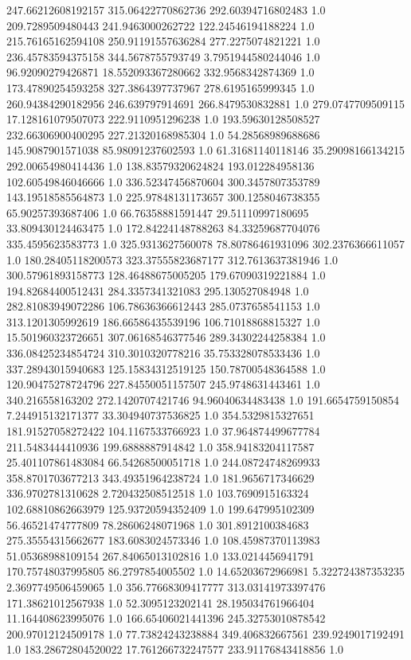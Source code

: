 247.66212608192157	315.06422770862736	292.60394716802483	1.0
209.7289509480443	241.9463000262722	122.24546194188224	1.0
215.76165162594108	250.91191557636284	277.2275074821221	1.0
236.45783594375158	344.5678755793749	3.7951944580244046	1.0
96.92090279426871	18.552093367280662	332.9568342874369	1.0
173.47890254593258	327.3864397737967	278.6195165999345	1.0
260.94384290182956	246.639797914691	266.8479530832881	1.0
279.0747709509115	17.128161079507073	222.9110951296238	1.0
193.59630128508527	232.66306900400295	227.21320168985304	1.0
54.28568989688686	145.9087901571038	85.98091237602593	1.0
61.31681140118146	35.29098166134215	292.00654980414436	1.0
138.83579320624824	193.012284958136	102.60549846046666	1.0
336.52347456870604	300.3457807353789	143.19518585564873	1.0
225.97848131173657	300.1258046738355	65.90257393687406	1.0
66.76358881591447	29.51110997180695	33.809430124463475	1.0
172.84224148788263	84.33259687704076	335.4595623583773	1.0
325.9313627560078	78.80786461931096	302.2376366611057	1.0
180.28405118200573	323.37555823687177	312.7613637381946	1.0
300.57961893158773	128.46488675005205	179.67090319221884	1.0
194.82684400512431	284.3357341321083	295.130527084948	1.0
282.81083949072286	106.78636366612443	285.0737658541153	1.0
313.1201305992619	186.66586435539196	106.71018868815327	1.0
15.501960323726651	307.06168546377546	289.34302244258384	1.0
336.08425234854724	310.3010320778216	35.753328078533436	1.0
337.28943015940683	125.15834312519125	150.78700548364588	1.0
120.90475278724796	227.84550051157507	245.9748631443461	1.0
340.216558163202	272.1420707421746	94.96040634483438	1.0
191.6654759150854	7.244915132171377	33.304940737536825	1.0
354.5329815327651	181.91527058272422	104.1167533766923	1.0
37.964874499677784	211.5483444410936	199.6888887914842	1.0
358.94183204117587	25.401107861483084	66.54268500051718	1.0
244.08724748269933	358.8701703677213	343.49351964238724	1.0
181.9656717346629	336.9702781310628	2.720432508512518	1.0
103.7690915163324	102.68810862663979	125.93720594352409	1.0
199.647995102309	56.46521474777809	78.28606248071968	1.0
301.8912100384683	275.35554315662677	183.6083024573346	1.0
108.45987370113983	51.05368988109154	267.84065013102816	1.0
133.0214456941791	170.75748037995805	86.2797854005502	1.0
14.65203672966981	5.322724387353235	2.3697749506459065	1.0
356.77668309417777	313.03141973397476	171.38621012567938	1.0
52.3095123202141	28.195034761966404	11.164408623995076	1.0
166.65406021441396	245.32753010878542	200.97012124509178	1.0
77.73824243238884	349.406832667561	239.9249017192491	1.0
183.28672804520022	17.761266732247577	233.91176843418856	1.0
